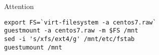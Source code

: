\documentclass[openany,twoside]{book}
\begin{document}
\begin{attention}{Attention}
\begin{mdframed}[topline=false, bottomline=false, leftline=false, rightline=false, backgroundcolor=lbcolor]
\begin{verbatim}
export FS=`virt-filesystem -a centos7.raw`
guestmount -a centos7.raw -m $FS /mnt
sed -i 's/xfs/ext4/g' /mnt/etc/fstab
guestumount /mnt
\end{verbatim}
\end{mdframed}
\end{attention}
\end{document}

